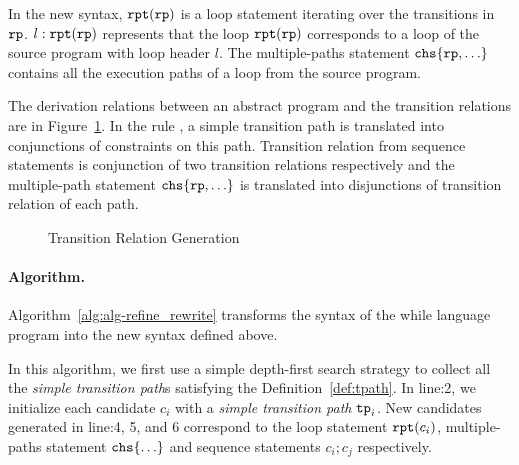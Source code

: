 In the new syntax, $\mathtt{rpt}(\mathtt{rp})$ is a loop statement iterating over the transitions in $\mathtt{rp}$.
$l: \mathtt{rpt}(\mathtt{rp})$ represents that the loop $ \mathtt{rpt}(\mathtt{rp})$
corresponds to a loop of the source program with loop header $l$.
The multiple-paths statement $\rpchoose{\rprog, \ldots} $ contains all the execution paths of a loop from the source program.

The derivation relations between an abstract program and the transition relations are in Figure~\ref{fig:transition-relation-rule}.
In the rule , a simple transition path is translated into conjunctions of constraints on this path.
Transition relation from sequence statements is conjunction of two transition relations respectively and the multiple-path statement $\rpchoose{\rprog, \ldots} $ is translated into disjunctions of 
transition relation of each path.

\begin{figure}
    \caption{Transition Relation Generation}
    \label{fig:transition-relation-rule}
\end{figure}


\paragraph{Algorithm.}
Algorithm~\ref{alg:alg-refine_rewrite} transforms the syntax of the while language program 
into the new syntax defined above.

In this algorithm, we first use a simple depth-first search strategy to collect all the \emph{simple transition path}s satisfying the Definition~\ref{def:tpath}. 
In line:2, we initialize each candidate $c_i$ with a \emph{simple transition path} $\mathtt{tp}_i$. 
New candidates generated in line:4, 5, and 6 correspond to the loop statement $\mathtt{rpt}(c_i)$, multiple-paths statement $\rpchoose{\ldots}$ and sequence statements $c_i; c_j$ respectively.

